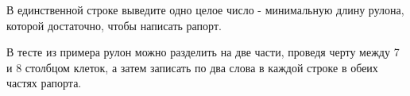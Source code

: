 \begin{problem}
\OutputFile

В единственной строке выведите одно целое число - минимальную длину рулона, которой достаточно, чтобы написать рапорт.

\Examples

\begin{example}
%
\end{example}

\Note

В тесте из примера рулон можно разделить на две части, проведя черту между 7 и 8 столбцом клеток, а затем записать по два слова в каждой строке в обеих частях рапорта.

\end{problem}